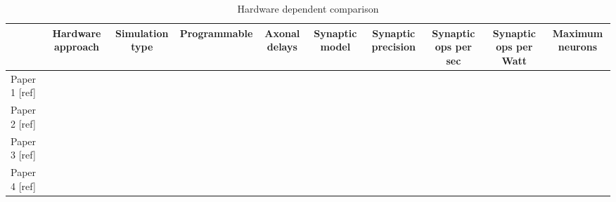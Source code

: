 \begin{table*}
  \caption{Hardware dependent comparison}
  \begin{center}
      \bgroup
      \def\arraystretch{1.4}
    \begin{tabular}{l | c c c c c c c c c}
      $ $ & 
       \begin{minipage}{1.2cm}\centering Hardware approach \end{minipage} & 
       \begin{minipage}{1.3cm}\centering Simulation type \end{minipage} & 
       \begin{minipage}{1.7cm}\centering Programmable \end{minipage} & 
       \begin{minipage}{1cm}\centering Axonal delays \end{minipage} & 
       \begin{minipage}{1cm}\centering Synaptic model \end{minipage} & 
       \begin{minipage}{1.2cm}\centering Synaptic precision \end{minipage} & 
       \begin{minipage}{1.4cm}\centering Synaptic ops per sec \end{minipage} & 
       \begin{minipage}{1.6cm}\centering Synaptic ops per Watt \end{minipage} & 
       \begin{minipage}{1.7cm}\centering Maximum neurons \end{minipage}  \\
       \hline
       \begin{minipage}{1.8cm}\centering Paper 1 [ref] \end{minipage} & & & & & & & & & \\
       \begin{minipage}{1.8cm}\centering Paper 2 [ref]\end{minipage} & & & & & & & & & \\
       \begin{minipage}{1.8cm}\centering Paper 3 [ref]\end{minipage} & & & & & & & & & \\
       \begin{minipage}{1.8cm}\centering Paper 4 [ref]\end{minipage} & & & & & & & & & 
    \end{tabular}
    \egroup
  \end{center}
  \label{tb:hardware_comparison}
\end{table*}
    
